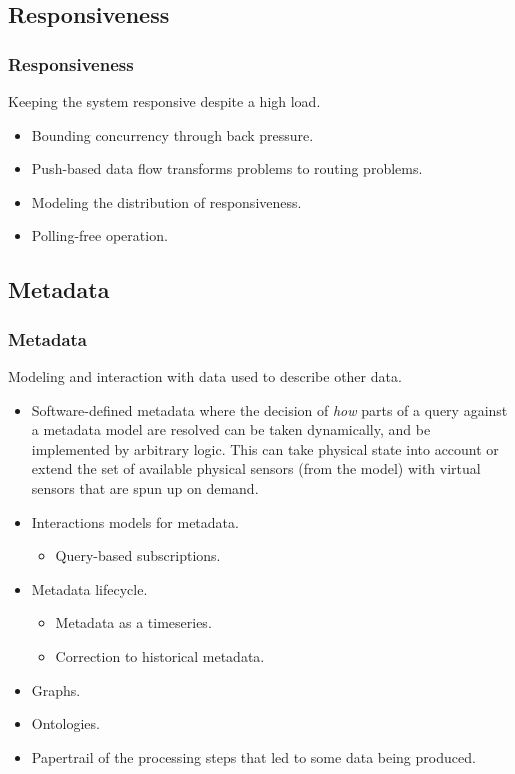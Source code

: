 \subsection{Responsiveness}
\begin{frame}
    \frametitle{Responsiveness}
    \vspace{0mm}
    Keeping the system responsive despite a high load.
    \vspace{3mm}
    \begin{itemize}
        \item Bounding concurrency through back pressure.
        \item Push-based data flow transforms problems to routing problems.
        \item Modeling the distribution of responsiveness.
        \item Polling-free operation.
    \end{itemize}
\end{frame}

\subsection{Metadata}
\begin{frame}
    \frametitle{Metadata}
    \vspace{0mm}
    Modeling and interaction with data used to describe other data.
    \vspace{2mm}
    \begin{itemize}
        \item Software-defined metadata where the decision of \textsl{how} parts of a query against a metadata model are resolved can be taken dynamically, and be implemented by arbitrary logic. This can take physical state into account or extend the set of available physical sensors (from the model) with virtual sensors that are spun up on demand.
        \item Interactions models for metadata.
          \begin{itemize}
            \item Query-based subscriptions.
          \end{itemize}
        \item Metadata lifecycle.
          \begin{itemize}
            \item Metadata as a timeseries.
            \item Correction to historical metadata.
          \end{itemize}
        \item Graphs.
        \item Ontologies.
        \item Papertrail of the processing steps that led to some data being produced.
    \end{itemize}
\end{frame}

